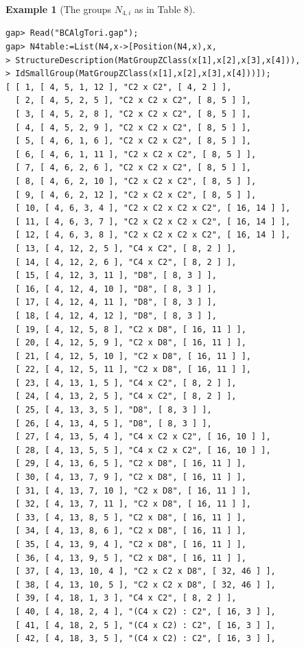 \documentclass{amsart}
\theoremstyle{plain}
\theoremstyle{definition}
\newtheorem{example}[theorem]{Example}
\theoremstyle{remark}
\begin{document}
\bigskip
\begin{example}[The groups $N_{4,i}$ as in Table $8$]~\vspace*{-5mm}\\
\begin{verbatim}
gap> Read("BCAlgTori.gap");
gap> N4table:=List(N4,x->[Position(N4,x),x,
> StructureDescription(MatGroupZClass(x[1],x[2],x[3],x[4])),
> IdSmallGroup(MatGroupZClass(x[1],x[2],x[3],x[4]))]);
[ [ 1, [ 4, 5, 1, 12 ], "C2 x C2", [ 4, 2 ] ], 
  [ 2, [ 4, 5, 2, 5 ], "C2 x C2 x C2", [ 8, 5 ] ], 
  [ 3, [ 4, 5, 2, 8 ], "C2 x C2 x C2", [ 8, 5 ] ], 
  [ 4, [ 4, 5, 2, 9 ], "C2 x C2 x C2", [ 8, 5 ] ], 
  [ 5, [ 4, 6, 1, 6 ], "C2 x C2 x C2", [ 8, 5 ] ], 
  [ 6, [ 4, 6, 1, 11 ], "C2 x C2 x C2", [ 8, 5 ] ], 
  [ 7, [ 4, 6, 2, 6 ], "C2 x C2 x C2", [ 8, 5 ] ], 
  [ 8, [ 4, 6, 2, 10 ], "C2 x C2 x C2", [ 8, 5 ] ], 
  [ 9, [ 4, 6, 2, 12 ], "C2 x C2 x C2", [ 8, 5 ] ], 
  [ 10, [ 4, 6, 3, 4 ], "C2 x C2 x C2 x C2", [ 16, 14 ] ], 
  [ 11, [ 4, 6, 3, 7 ], "C2 x C2 x C2 x C2", [ 16, 14 ] ], 
  [ 12, [ 4, 6, 3, 8 ], "C2 x C2 x C2 x C2", [ 16, 14 ] ], 
  [ 13, [ 4, 12, 2, 5 ], "C4 x C2", [ 8, 2 ] ], 
  [ 14, [ 4, 12, 2, 6 ], "C4 x C2", [ 8, 2 ] ], 
  [ 15, [ 4, 12, 3, 11 ], "D8", [ 8, 3 ] ], 
  [ 16, [ 4, 12, 4, 10 ], "D8", [ 8, 3 ] ], 
  [ 17, [ 4, 12, 4, 11 ], "D8", [ 8, 3 ] ], 
  [ 18, [ 4, 12, 4, 12 ], "D8", [ 8, 3 ] ], 
  [ 19, [ 4, 12, 5, 8 ], "C2 x D8", [ 16, 11 ] ], 
  [ 20, [ 4, 12, 5, 9 ], "C2 x D8", [ 16, 11 ] ], 
  [ 21, [ 4, 12, 5, 10 ], "C2 x D8", [ 16, 11 ] ], 
  [ 22, [ 4, 12, 5, 11 ], "C2 x D8", [ 16, 11 ] ], 
  [ 23, [ 4, 13, 1, 5 ], "C4 x C2", [ 8, 2 ] ], 
  [ 24, [ 4, 13, 2, 5 ], "C4 x C2", [ 8, 2 ] ], 
  [ 25, [ 4, 13, 3, 5 ], "D8", [ 8, 3 ] ], 
  [ 26, [ 4, 13, 4, 5 ], "D8", [ 8, 3 ] ], 
  [ 27, [ 4, 13, 5, 4 ], "C4 x C2 x C2", [ 16, 10 ] ], 
  [ 28, [ 4, 13, 5, 5 ], "C4 x C2 x C2", [ 16, 10 ] ], 
  [ 29, [ 4, 13, 6, 5 ], "C2 x D8", [ 16, 11 ] ], 
  [ 30, [ 4, 13, 7, 9 ], "C2 x D8", [ 16, 11 ] ], 
  [ 31, [ 4, 13, 7, 10 ], "C2 x D8", [ 16, 11 ] ], 
  [ 32, [ 4, 13, 7, 11 ], "C2 x D8", [ 16, 11 ] ], 
  [ 33, [ 4, 13, 8, 5 ], "C2 x D8", [ 16, 11 ] ], 
  [ 34, [ 4, 13, 8, 6 ], "C2 x D8", [ 16, 11 ] ], 
  [ 35, [ 4, 13, 9, 4 ], "C2 x D8", [ 16, 11 ] ], 
  [ 36, [ 4, 13, 9, 5 ], "C2 x D8", [ 16, 11 ] ], 
  [ 37, [ 4, 13, 10, 4 ], "C2 x C2 x D8", [ 32, 46 ] ], 
  [ 38, [ 4, 13, 10, 5 ], "C2 x C2 x D8", [ 32, 46 ] ], 
  [ 39, [ 4, 18, 1, 3 ], "C4 x C2", [ 8, 2 ] ], 
  [ 40, [ 4, 18, 2, 4 ], "(C4 x C2) : C2", [ 16, 3 ] ], 
  [ 41, [ 4, 18, 2, 5 ], "(C4 x C2) : C2", [ 16, 3 ] ], 
  [ 42, [ 4, 18, 3, 5 ], "(C4 x C2) : C2", [ 16, 3 ] ], 

\end{verbatim}
\end{example}
\end{document}
